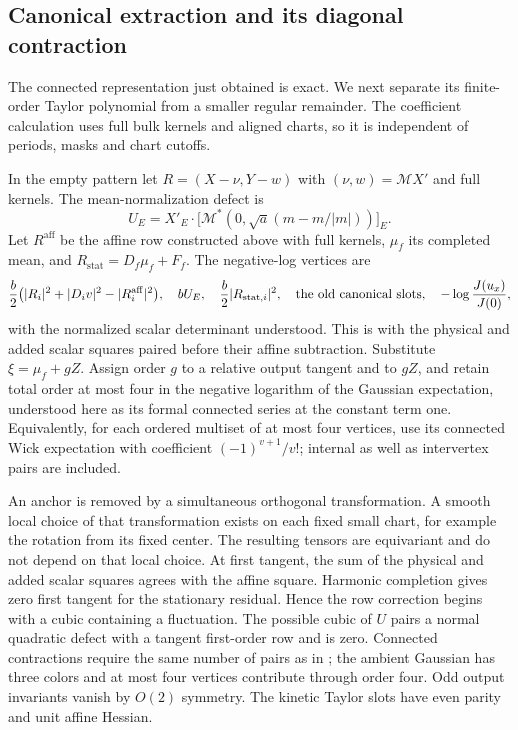 \subsection{Canonical extraction and its diagonal contraction}
\label{subsec:rg-canonical}

The connected representation just obtained is exact.  We next separate
its finite-order Taylor polynomial from a smaller regular remainder.
The coefficient calculation uses full bulk kernels and aligned charts,
so it is independent of periods, masks and chart cutoffs.

In the empty pattern let $R=(X-\nu,Y-w)$ with
$(\nu,w)=\mathcal M X'$ and full kernels.  The mean-normalization
defect is
\[
 U_E=X'_E\cdot\bigl[\mathcal M^*
                    (0,\sqrt a(m-m/|m|))\bigr]_E.
\]
Let $R^{\mathrm{aff}}$ be the affine row constructed above with full
kernels, $\mu_f$ its completed mean, and
$R_{\mathrm{stat}}=D_f\mu_f+F_f$.  The negative-log vertices are
\[
 \frac b2\bigl(|R_i|^2+|D_iv|^2-|R_i^{\mathrm{aff}}|^2\bigr),
 \quad bU_E,\quad\frac b2|R_{\mathrm{stat},i}|^2,
 \quad\hbox{the old canonical slots},\quad
 -\log\frac{J(u_x)}{J(0)},
\]
with the normalized scalar determinant understood.  This is
 with the physical and added scalar
squares paired before their affine subtraction.  Substitute
$\xi=\mu_f+gZ$.  Assign order $g$ to a relative output tangent and to
$gZ$, and retain total order at most four in the negative logarithm
of the Gaussian expectation, understood here as its formal connected
series at the constant term one.  Equivalently, for each ordered multiset
of at most four vertices, use its connected Wick expectation with
coefficient $(-1)^{v+1}/v!$; internal as well as intervertex pairs are
included.

An anchor is removed by a simultaneous orthogonal transformation.
A smooth local choice of that transformation exists on each fixed
small chart, for example the rotation from its fixed center.  The
resulting tensors are equivariant and do not depend on that local
choice.  At first tangent, the sum of the physical and added scalar
squares agrees with the affine square.  Harmonic completion gives
zero first tangent for the stationary residual.  Hence the row
correction begins with a cubic containing a fluctuation.  The
possible cubic of $U$ pairs a normal quadratic defect with a tangent
first-order row and is zero.  Connected contractions require the
same number of pairs as in ; the
ambient Gaussian has three colors and at most four vertices contribute
through order four.  Odd output invariants vanish by $O(2)$ symmetry.
The kinetic Taylor slots have even parity and unit affine Hessian.

